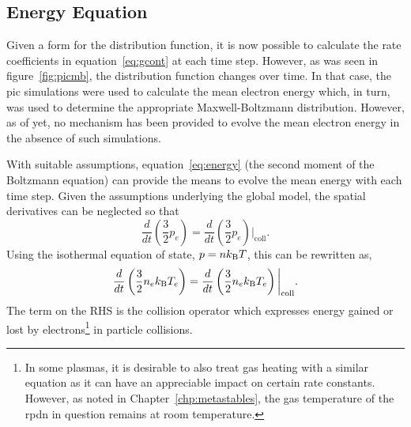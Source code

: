 \subsection{Energy Equation}

Given a form for the distribution function, it is now possible to calculate the
rate coefficients in equation~\ref{eq:gcont} at each time step. However, as was
seen in figure~\ref{fig:picmb}, the distribution function changes over time. In
that case, the \acs{pic} simulations were used to calculate the mean electron
energy which, in turn, was used to determine the appropriate Maxwell-Boltzmann
distribution. However, as of yet, no mechanism has been provided to evolve the
mean electron energy in the absence of such simulations.

With suitable assumptions, equation~\ref{eq:energy} (the second moment of the
Boltzmann equation) can provide the means to evolve the mean energy with each
time step. Given the assumptions underlying the global model, the spatial
derivatives can be neglected so that
\begin{equation}
  \frac{d}{dt}\left(\frac{3}{2}p_e\right) =
  \frac{d}{dt}\left(\frac{3}{2}p_e\right)\bigg|_\mathrm{coll}.
\end{equation}
Using the isothermal equation of state, $p=nk_\mathrm{B} T$, this can be rewritten as,
\begin{equation}
  \frac{d}{dt}\left(\frac{3}{2}n_ek_\mathrm{B} T_e \right) =
  \frac{d}{dt}\left(\frac{3}{2}n_ek_\mathrm{B} T_e \right)\bigg|_\mathrm{coll}.
  \label{eq:energy2}
\end{equation}
The term on the RHS is the collision operator which expresses energy gained or
lost by electrons\footnote{In some plasmas, it is desirable to also treat gas
heating with a similar equation as it can have an appreciable impact on certain
rate constants. However, as noted in Chapter~\ref{chp:metastables}, the gas
temperature of the \acs{rpdn} in question remains at room temperature.} in
particle collisions.

